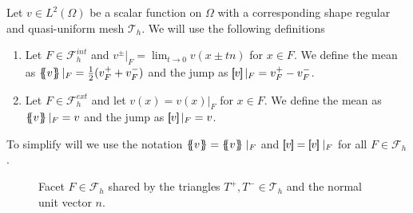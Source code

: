 \begin{definition}
    Let $v\in L^2( \Omega ) $ be a scalar function on $\Omega$ with a corresponding shape regular and quasi-uniform mesh $\mathcal{T}_{h} $. We will use the following definitions
    \begin{enumerate}[label=\arabic*)]
        \item Let $F \in \mathcal{F}^{int} _{h}$ and $v^{\pm}| _{F} = \lim_{t\to 0} v( x \pm tn)   $ for $x \in F$. We define the mean as $\left\{\!\!\left\{ v\right\}\!\!\right\} |_{F} = \frac{1}{2} (v^{+}_{F} + v^{-}_{F})   $ and the jump as $\left[\!\!\left[ v \right]\!\!\right]|_{F} =  v^{+}_{F} - v^{-}_{F} $.
        \item Let $F \in \mathcal{F}^{ext} _{h}$ and let $ v( x) =  v(x)|_{F} $ for  $x \in F$.
We define the mean as $\left\{\!\!\left\{ v\right\}\!\!\right\} |_{F} = v    $ and the jump as $\left[\!\!\left[ v \right]\!\!\right]|_{F} = v$.

    \end{enumerate}
    To simplify will we use the notation $\mean{ v } = \mean{ v } \mid _{F}    $ and $\jump{ v } = \jump{ v } \mid _{F}    $ for all $F \in \mathcal{F} _{h}$.

\end{definition}




\begin{figure}[!h]
\centering
{}

\caption{Facet $F \in \mathcal{F}_h $ shared by the triangles $T^{+}, T^{-} \in \mathcal{T}_{h} $ and the normal unit vector $n$.  }
    \label{fig:normal}
\end{figure}

